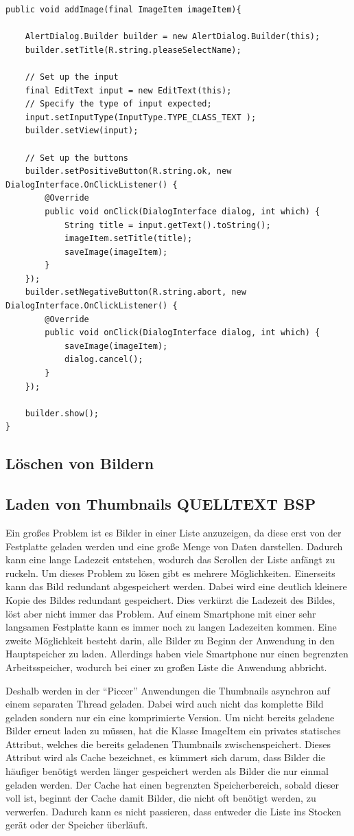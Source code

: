 \begin{lstlisting}
public void addImage(final ImageItem imageItem){

    AlertDialog.Builder builder = new AlertDialog.Builder(this);
    builder.setTitle(R.string.pleaseSelectName);

    // Set up the input
    final EditText input = new EditText(this);
    // Specify the type of input expected;
    input.setInputType(InputType.TYPE_CLASS_TEXT );
    builder.setView(input);

    // Set up the buttons
    builder.setPositiveButton(R.string.ok, new DialogInterface.OnClickListener() {
        @Override
        public void onClick(DialogInterface dialog, int which) {
            String title = input.getText().toString();
            imageItem.setTitle(title);
            saveImage(imageItem);
        }
    });
    builder.setNegativeButton(R.string.abort, new DialogInterface.OnClickListener() {
        @Override
        public void onClick(DialogInterface dialog, int which) {
            saveImage(imageItem);
            dialog.cancel();
        }
    });

    builder.show();
}
\end{lstlisting}
\subsection{Löschen von Bildern}
\subsection{Laden von Thumbnails QUELLTEXT BSP}
Ein großes Problem ist es Bilder in einer Liste anzuzeigen,
da diese erst von der Festplatte geladen werden und eine große Menge von Daten darstellen.
Dadurch kann eine lange Ladezeit entstehen,
wodurch das Scrollen der Liste anfängt zu ruckeln.
Um dieses Problem zu lösen gibt es mehrere Möglichkeiten.
Einerseits kann das Bild redundant abgespeichert werden.
Dabei wird eine deutlich kleinere Kopie des Bildes redundant gespeichert.
Dies verkürzt die Ladezeit des Bildes, löst aber nicht immer das Problem.
Auf einem Smartphone mit einer sehr langsamen Festplatte kann es immer noch zu langen Ladezeiten kommen.
Eine zweite Möglichkeit besteht darin, alle Bilder zu Beginn der Anwendung in den Hauptspeicher zu laden.
Allerdings haben viele Smartphone nur einen begrenzten Arbeitsspeicher, wodurch bei einer 
zu großen Liste die Anwendung abbricht.

Deshalb werden in der \enquote{Piccer} Anwendungen die Thumbnails asynchron auf einem separaten Thread geladen.
Dabei wird auch nicht das komplette Bild geladen sondern nur ein eine komprimierte Version.
Um nicht bereits geladene Bilder erneut laden zu müssen,
hat die Klasse ImageItem ein privates statisches Attribut, welches die bereits geladenen Thumbnails zwischenspeichert.
Dieses Attribut wird als Cache bezeichnet, es kümmert sich darum, dass Bilder die häufiger 
benötigt werden länger gespeichert werden als Bilder die nur einmal geladen werden.
Der Cache hat einen begrenzten Speicherbereich, sobald dieser voll ist, beginnt der Cache
damit Bilder, die nicht oft benötigt werden, zu verwerfen.
Dadurch kann es nicht passieren, dass entweder die Liste ins Stocken gerät oder der Speicher überläuft.

